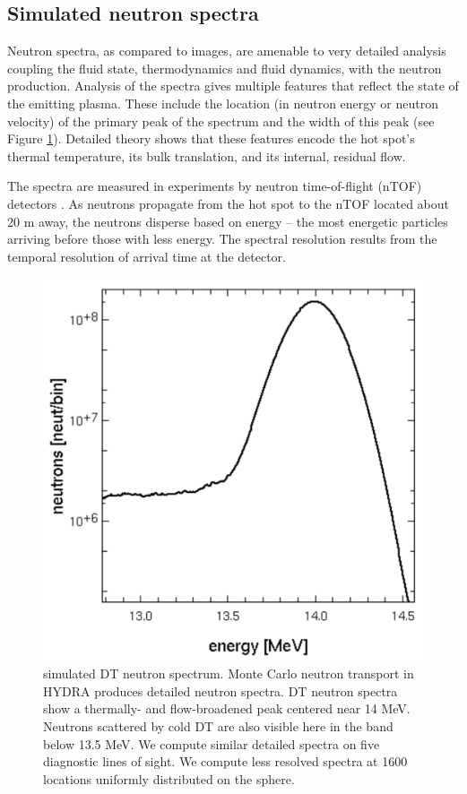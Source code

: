 \documentclass[aip,pop,numerical,reprint,floatfix]{revtex4-1}
\begin{document}
\subsection{\label{sec:sim_spectra}Simulated neutron spectra}

Neutron spectra, as compared to images, are amenable to very detailed
analysis coupling the fluid state, thermodynamics and fluid dynamics,
with the neutron production. Analysis of the spectra gives multiple
features that reflect the state of the emitting plasma. These include
the location (in neutron energy or neutron velocity) of the primary
peak of the spectrum and the width of this peak (see Figure \ref{fig:neut_spectrum}).
Detailed theory shows that these features encode the hot spot's thermal
temperature, its bulk translation, and its internal, residual flow.

The spectra are measured in experiments by neutron time-of-flight
(nTOF) detectors \cite{glebov_ntof_NIF_test}.
As neutrons propagate from the hot spot to the nTOF located about
20 m away, the neutrons disperse based on energy -- the most energetic
particles arriving before those with less energy. The spectral resolution
results from the temporal resolution of arrival time at the detector.

\begin{figure}[h]
\begin{centering}
\includegraphics[width=0.8\columnwidth]{neut_spectrum}
\par\end{centering}
\caption{\label{fig:neut_spectrum}simulated DT neutron spectrum. Monte Carlo neutron transport in HYDRA produces detailed neutron spectra. DT neutron spectra show a thermally- and flow-broadened peak centered near 14 MeV. Neutrons scattered by cold DT are also visible here in the band below 13.5 MeV. We compute similar detailed spectra on five diagnostic lines of sight.  We compute less resolved spectra at 1600 locations uniformly distributed on the sphere. }
\end{figure}
\end{document}
